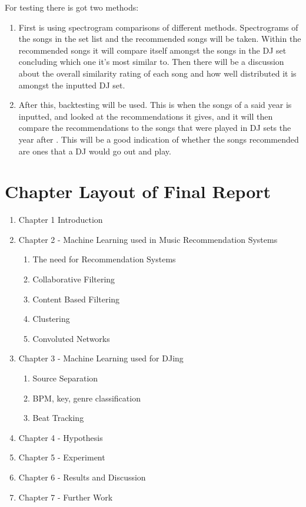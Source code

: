 \documentclass[11pt,titlepage,oneside]{book}
\begin{document}
\begin{flushleft}
	For testing there is got two methods: 
\end{flushleft}
\begin{enumerate}
	\item First is using spectrogram comparisons of different methods. Spectrograms of the songs in the set list and the recommended songs will be taken. Within the recommended songs it will compare itself amongst the songs in the DJ set concluding which one it’s most similar to. Then there will be a discussion about the overall similarity rating of each song and how well distributed it is amongst the inputted DJ set.
	\item After this, backtesting will be used. This is when the songs of a said year is inputted, and looked at the recommendations it gives, and it will then compare the recommendations to the songs that were played in DJ sets the year after \citep{olorunnimbe_deep_2022}. This will be a good indication of whether the songs recommended are ones that a DJ would go out and play.
\end{enumerate}

\section{Chapter Layout of Final Report}
\begin{enumerate}
	\item Chapter 1 Introduction
	\item Chapter 2 - Machine Learning used in Music Recommendation Systems
	\begin{enumerate}
		\item The need for Recommendation Systems
		\item Collaborative Filtering
		\item Content Based Filtering
		\item Clustering
		\item Convoluted Networks
	\end{enumerate}
	\item Chapter 3 - Machine Learning used for DJing
	\begin{enumerate}
		\item Source Separation
		\item BPM, key, genre classification
		\item Beat Tracking 
	\end{enumerate}
	\item Chapter 4 - Hypothesis
	\item Chapter 5 - Experiment
	\item Chapter 6 - Results and Discussion
	\item Chapter 7 - Further Work
	
\end{enumerate}


\end{document}

